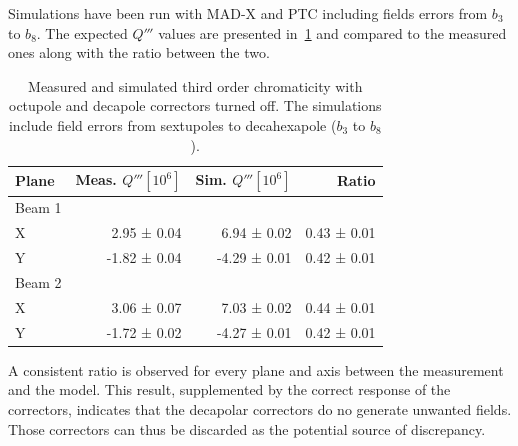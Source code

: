 Simulations have been run with MAD-X and PTC including fields errors from $b_3$ to $b_8$. The
expected $Q'''$ values are presented in~\cref{table:decapoles:bare_chromaticity:virgin_dq3} and
compared to the measured ones along with the ratio between the two.

\begin{table}[tbh]
    \centering
    \begin{tabular}{|l||r|r|r|}
    \hline
        Plane     &  Meas. $Q''' [10^6]$        &  Sim. $Q''' [10^{6}]$          &   Ratio     \\\hline\hline
        Beam 1    &                             &                                &             \\
                X &            2.95 ± 0.04      &         6.94 ± 0.02            &  0.43 ± 0.01  \\
                Y &           -1.82 ± 0.04      &        -4.29 ± 0.01            &  0.42 ± 0.01  \\ \hline
        Beam 2    &                             &                                &             \\
                X &            3.06 ± 0.07      &        7.03 ± 0.02             &  0.44 ± 0.01 \\
                Y &           -1.72 ± 0.02      &       -4.27 ± 0.01             &  0.42 ± 0.01  \\ \hline
    \end{tabular}
    \caption{Measured and simulated third order chromaticity with octupole and decapole correctors
    turned off. The simulations include field errors from sextupoles to decahexapole ($b_3$ to
    $b_8$).}
    \label{table:decapoles:bare_chromaticity:virgin_dq3}
\end{table}

A consistent ratio is observed for every plane and axis between the measurement and the model. This
result, supplemented by the correct response of the correctors, indicates that the decapolar
correctors do no generate unwanted fields. Those correctors can thus be discarded as the potential
source of discrepancy.